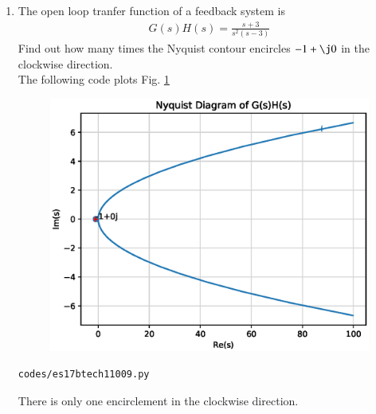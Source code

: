 \begin{enumerate}[label=\thesection.\arabic*.,ref=\thesection.\theenumi]

\item The open loop tranfer function of a feedback system is 
\begin{align}
G(s)H(s) = \frac{s+3}{s^2(s-3)}
\label{eq:es17btech11009_system}
\end{align}
Find out how many times the Nyquist contour encircles $-1 + \j0$ in the clockwise direction.
\\
\solution The following code plots Fig. \ref{fig:es17btech11009_1}
%
\begin{figure}[!h]
\centering
\includegraphics[width=\columnwidth]{./figs/es17btech11009.eps}
\caption{}
\label{fig:es17btech11009_1}
\end{figure}

\begin{lstlisting}
codes/es17btech11009.py
\end{lstlisting}
%
There is only one encirclement in the clockwise direction.
\end{enumerate}
